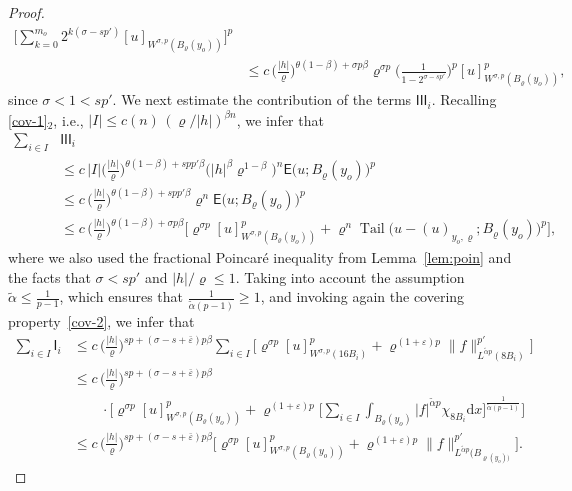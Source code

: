 \documentclass[10pt,letterpaper]{amsart}
\theoremstyle{definition}
\numberwithin{theorem}{section}
\numberwithin{equation}{section}
\newcommand{\1}{\ensuremath{\mathds{1}}}
\newcommand{\dx}{\mathrm{d}x}
\newcommand\sfE{{\boldsymbol{\mathsf E}}}
\newcommand\sfI{{\boldsymbol{\mathsf I}}}
\renewcommand{\epsilon}{\varepsilon}
\renewcommand{\rho}{\varrho}
\renewcommand{\epsilon}{\varepsilon}
\renewcommand{\rho}{\varrho}
\DeclareMathOperator{\Tail}{Tail}
\numberwithin{equation}{section}
\begin{document}
\begin{proof}
\begin{align*}
    \Bigg[
        \sum_{k=0}^{m_o}
        2^{k(\sigma-sp')}
        [u]_{W^{\sigma,p}(B_\rho(y_o))}
    \Bigg]^p \\
    &\le c\,
    \Big(\frac{|h|}{\rho}\Big)^{\theta(1-\beta)+\sigma p\beta} \rho^{\sigma p}
    \bigg( \frac{1}{1-2^{\sigma-sp'}} \bigg)^p
    [u]_{W^{\sigma,p}(B_\rho(y_o))}^p,
\end{align*}
since \(\sigma<1<sp'\). 
We next estimate the contribution of the terms $\sfI\sfI\sfI_i$.
Recalling \eqref{cov-1}$_2$, i.e., $|I|\le c(n)\,(\rho/|h|)^{\beta n}$, we infer that
\begin{align*}
    \sum_{i\in I}& \sfI\sfI\sfI_i\\
    &\le
    c\, |I| \Big(\frac{|h|}{\rho}\Big)^{\theta(1-\beta)+spp'\beta} \big(|h|^{\beta}\rho^{1-\beta}\big)^n
    \sfE\big(u;B_\rho(y_o)\big)^p \\
    &\le
    c \,\Big(\frac{|h|}{\rho}\Big)^{\theta(1-\beta)+spp'\beta} \rho^n
    \sfE\big(u;B_\rho(y_o)\big)^p \\
    &\le
    c \,\Big(\frac{|h|}{\rho}\Big)^{\theta(1-\beta)+\sigma p\beta} 
    \Big[\rho^{\sigma p}[u]_{W^{\sigma,p}(B_\rho(y_o))}^p
        + \rho^{n}\Tail\big(u-(u)_{y_o,\rho};B_\rho(y_o)\big)^p\Big],
\end{align*}
where we also used the fractional Poincar\'e inequality from Lemma~\ref{lem:poin} and the facts that $\sigma<sp'$ and $|h|/\rho\le 1$.
Taking into account the assumption
\(\tilde\alpha \le \frac{1}{p-1}\), which ensures that
\(\frac{1}{\tilde\alpha(p-1)} \ge 1\), and invoking again
the covering property~\eqref{cov-2}, we infer that
\begin{align*}
    \sum_{i\in I} \sfI_i
    &\le
    c\, \Big(\frac{|h|}{\rho}\Big)^{sp+(\sigma-s+\bar\epsilon)p\beta} 
    \sum_{i\in I}\Big[ \rho^{\sigma p}
    [u]_{W^{\sigma,p}(16B_i)}^p +
    \rho^{(1+\epsilon)p}
    \|f\|_{L^{\tilde\alpha p}(8B_i)}^{p'} \Big] \\
    &\le 
    c\, \Big(\frac{|h|}{\rho}\Big)^{sp+(\sigma-s+\bar\epsilon)p\beta}\\
    &\qquad\cdot
    \Bigg[
    \rho^{\sigma p}
    [u]_{W^{\sigma,p}(B_\rho(y_o))}^p
    +
    \rho^{(1+\epsilon)p}\bigg[
    \sum_{i\in I}\int_{B_\rho (y_o)}|f|^{\tilde\alpha p}\chi_{8B_i}\dx
    \bigg]^\frac1{\tilde\alpha (p-1)}
    \Bigg]\\
    &\le
    c\, \Big(\frac{|h|}{\rho}\Big)^{sp+(\sigma-s+\bar\epsilon)p\beta}
    \Big[
    \rho^{\sigma p}
    [u]_{W^{\sigma,p}(B_\rho(y_o))}^p
    +
    \rho^{(1+\epsilon)p}
    \|f\|_{L^{\tilde\alpha p}(B_{\rho (y_o))}}^{p'} \Big].

\end{align*}
\end{proof}
\end{document}

